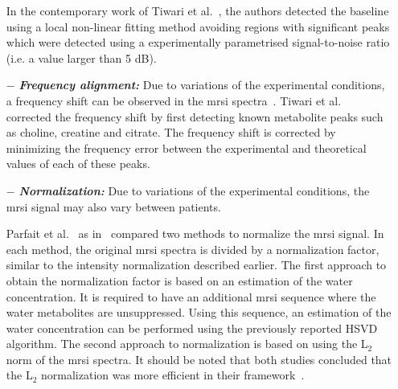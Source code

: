\begin{enumerate}[leftmargin=*]
  In the contemporary work of Tiwari et al.~\cite{Tiwari2012}, the authors detected the baseline using a local non-linear fitting method avoiding regions with significant peaks which were detected using a experimentally parametrised signal-to-noise ratio (i.e. a value larger than 5 dB).

\item[$-$] \textbf{\textit{Frequency alignment:}} Due to variations of the experimental conditions, a frequency shift can be observed in the \ac{mrsi} spectra~\cite{Chen2002,Osorio-Garcia2012}. Tiwari et al.~\cite{Tiwari2012} corrected the frequency shift by first detecting known metabolite peaks such as choline, creatine and citrate. The frequency shift is corrected by minimizing the frequency error between the experimental and theoretical values of each of these peaks.

\item[$-$] \textbf{\textit{Normalization:}} Due to variations of the experimental conditions, the \ac{mrsi} signal may also vary between patients.
  
  Parfait et al.~\cite{Parfait2012} as in~\cite{Devos2004} compared two methods to normalize the \ac{mrsi} signal. In each method, the original \ac{mrsi} spectra is divided by a normalization factor, similar to the intensity normalization described earlier. The first approach to obtain the normalization factor is based on an estimation of the water concentration. It is required to have an additional \ac{mrsi} sequence where the water metabolites are unsuppressed. Using this sequence, an estimation of the water concentration can be performed using the previously reported HSVD algorithm.  The second approach to normalization is based on using the L$_2$ norm of the \ac{mrsi} spectra. It should be noted that both studies concluded that the L$_2$ normalization was more efficient in their framework~\cite{Parfait2012,Devos2004}.
  
\end{enumerate}

